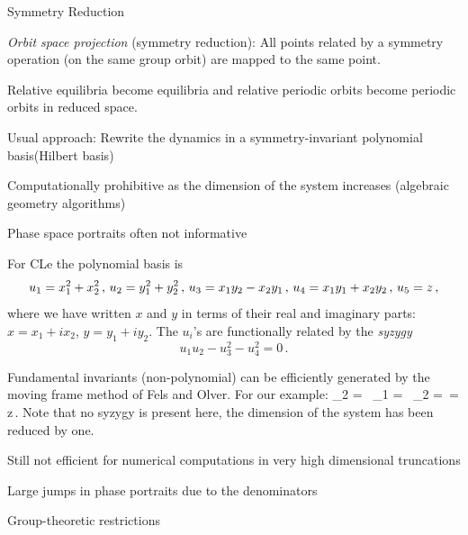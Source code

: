 \documentclass{theo1poster}[2003/04/25]
\renewcommand{\labelitemi}{\ding{228}}
\renewenvironment{itemize}%
 {\begin{list}{\labelitemi}%
       {%
        \setlength{\leftmargin}{0pt}%
        \setlength{\itemindent}{0pt}%
        \settowidth{\labelwidth}{\labelitemi}%
        \addtolength{\labelsep}{\itemindent}
        \addtolength{\leftmargin}{\labelwidth}%
        \addtolength{\leftmargin}{\labelsep}%
        \addtolength{\leftmargin}{-\itemindent}%
       }%
 }
 {\end{list}}
\begin{document}
\begin{poster}{3}
\begin{sheet}{\CLe}
\begin{itemize}
\end{itemize}
 
\end{sheet}




\begin{sheet}{Symmetry Reduction}


\begin{itemize}
 \item  \emph{Orbit space projection} (symmetry reduction): All points related by a symmetry
	operation (on the same group orbit) are mapped to the same point.
 \item Relative equilibria become equilibria and relative periodic orbits become periodic orbits in reduced space. 
 \item Usual approach: Rewrite the dynamics in a symmetry-invariant polynomial basis(Hilbert basis)
	\begin{itemize}
 		\item Computationally prohibitive as the dimension of the system increases (algebraic geometry algorithms)
		\item Phase space portraits often not informative
		\item For CLe the polynomial basis is
		\[
			u_1 = x_1^2+x_2^2 \,, \\\,
			u_2 = y_1^2+y_2^2 \,, \\\,
			u_3 = x_1 y_2-x_2 y_1\,, \\\,
			u_4 = x_1 y_1+x_2 y_2\,, \\\,
			u_5 = z\,,
		\]
	where we have written $x$ and $y$ in terms of their real and imaginary parts: $x=x_1+i x_2$, $y=y_1+i y_2$. The $u_i$'s are functionally related by the \emph{syzygy}
	\[
 		u_1 u_2 -u_3^2-u_4^2 =0\,.
	\]
	\end{itemize}
 \item Fundamental invariants (non-polynomial) can be efficiently
	generated by the moving frame method of Fels and Olver.
 	For our example:
\beq
	_2 =  \cont\,
	_1 = \cont\,
	_2 =\cont\, 
	= z\,.
	\label{eq:mfinv}
\eeq
Note that no syzygy is present here, the dimension of the system has
been reduced by one.
\begin{itemize}
 \item Still not efficient for numerical computations in very high dimensional
	truncations
 \item Large jumps in phase portraits due to the denominators
 \item Group-theoretic restrictions
\end{itemize}



\end{itemize}
\end{sheet}
\end{poster}
\end{document}
